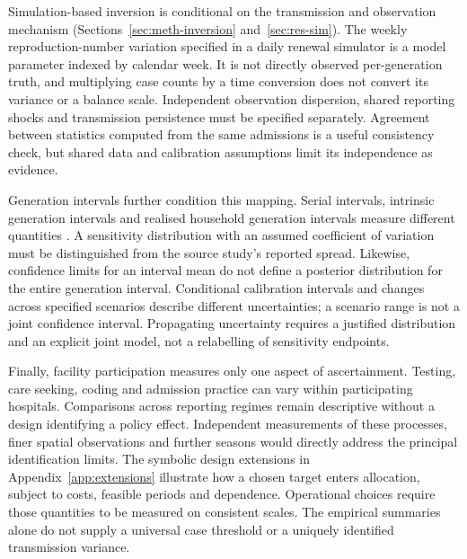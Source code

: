 Simulation-based inversion is conditional on the transmission and observation mechanism (Sections~\ref{sec:meth-inversion} and~\ref{sec:res-sim}). The weekly reproduction-number variation specified in a daily renewal simulator is a model parameter indexed by calendar week. It is not directly observed per-generation truth, and multiplying case counts by a time conversion does not convert its variance or a balance scale. Independent observation dispersion, shared reporting shocks and transmission persistence must be specified separately. Agreement between statistics computed from the same admissions is a useful consistency check, but shared data and calibration assumptions limit its independence as evidence.

Generation intervals further condition this mapping. Serial intervals, intrinsic generation intervals and realised household generation intervals measure different quantities \citep{cowling2009estimation, vink2014serial, chan2025estimating}. A sensitivity distribution with an assumed coefficient of variation must be distinguished from the source study's reported spread. Likewise, confidence limits for an interval mean do not define a posterior distribution for the entire generation interval. Conditional calibration intervals and changes across specified scenarios describe different uncertainties; a scenario range is not a joint confidence interval. Propagating uncertainty requires a justified distribution and an explicit joint model, not a relabelling of sensitivity endpoints.

Finally, facility participation measures only one aspect of ascertainment. Testing, care seeking, coding and admission practice can vary within participating hospitals. Comparisons across reporting regimes remain descriptive without a design identifying a policy effect. Independent measurements of these processes, finer spatial observations and further seasons would directly address the principal identification limits. The symbolic design extensions in Appendix~\ref{app:extensions} illustrate how a chosen target enters allocation, subject to costs, feasible periods and dependence. Operational choices require those quantities to be measured on consistent scales. The empirical summaries alone do not supply a universal case threshold or a uniquely identified transmission variance.
